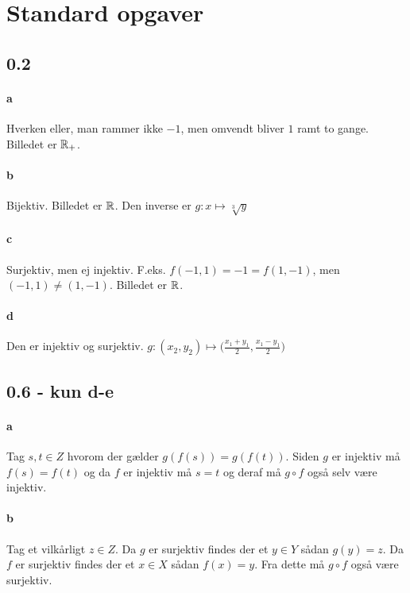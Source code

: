 	\section{Standard opgaver}

		\subsection{0.2} 

			\paragraph{a} Hverken eller, man rammer ikke $-1$, men omvendt bliver $1$ ramt to gange. Billedet er $\mathbb{R}_+$.

			\paragraph{b} Bijektiv. Billedet er $\mathbb{R}$. Den inverse er $g:x\mapsto \sqrt[3]{y}$

			\paragraph{c} Surjektiv, men ej injektiv. F.eks. $f(-1,1)=-1=f(1,-1)$, men $(-1,1)\neq (1,-1)$. Billedet er $\mathbb{R}$.

			\paragraph{d} Den er injektiv og surjektiv. $g:(x_2,y_2)\mapsto \big(\frac{x_1+y_1}{2},\frac{x_1-y_1}{2}\big)$

		\subsection{0.6 - kun d-e} 

			\paragraph{a} Tag $s,t\in Z$ hvorom der gælder $g(f(s))=g(f(t))$. Siden $g$ er injektiv må $f(s)=f(t)$ og da $f$ er injektiv må $s=t$ og deraf må $g \circ f$ også selv være injektiv.

			\paragraph{b} Tag et vilkårligt $z\in Z$. Da $g$ er surjektiv findes der et $y\in Y$ sådan $g(y)=z$. Da $f$ er surjektiv findes der et $x\in X$ sådan $f(x)=y$. Fra dette må $g \circ f$ også være surjektiv.

